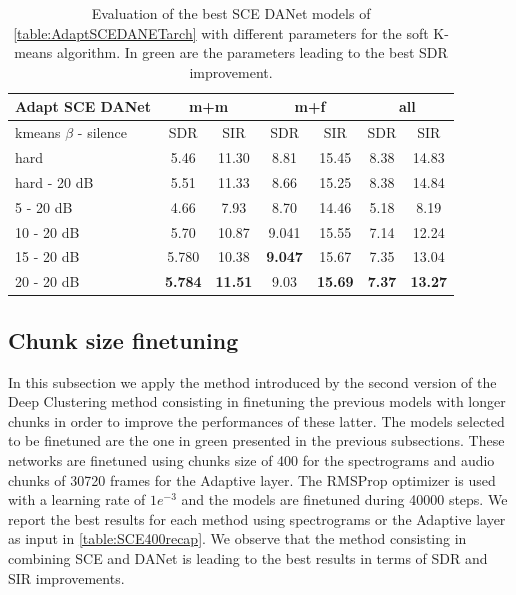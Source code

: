 \documentclass[master, tikz, final,11pt, dvipdfmx]{iscs-thesis}
\begin{document}
\begin{table}[h!]
\centering
\begin{tabular}{l|c|c|c|c|c|c}
Adapt SCE DANet & \multicolumn{2}{c|}{m+m} & \multicolumn{2}{c|}{m+f} & \multicolumn{2}{c}{all} \\ 
\hline 
kmeans $\beta$ - silence & SDR & SIR & SDR & SIR & SDR & SIR \\ 
\hline
hard  & 5.46 & 11.30 & 8.81 & 15.45 & 8.38 & 14.83 \\ 
hard - 20 dB  & 5.51 & 11.33 & 8.66 & 15.25 & 8.38 & 14.84 \\
\hline
\hline
5 - 20 dB  & 4.66 & 7.93 & 8.70 & 14.46 & 5.18 & 8.19 \\ 
10 - 20 dB  & 5.70 & 10.87 & 9.041 & 15.55 & 7.14 & 12.24 \\ 
15 - 20 dB & 5.780 & 10.38 & \cellcolor{green}\textbf{9.047} & \cellcolor{green}15.67 & 7.35 & 13.04 \\ 
20 - 20 dB & \cellcolor{green}\textbf{5.784} & \cellcolor{green}\textbf{11.51} & 9.03 & \textbf{15.69} & \cellcolor{green}\textbf{7.37} & \cellcolor{green}\textbf{13.27} \\ 
\end{tabular}
\caption[Evaluation of the best SCE DANet models using the Adaptive layer for different parameters for the soft K-means algorithm]{Evaluation of the best SCE DANet models of \autoref{table:AdaptSCEDANETarch} with different parameters for the soft K-means algorithm. In green are the parameters leading to the best SDR improvement.}
\label{table:AdaptSCEDANET}
\end{table}

\Needspace{}

\subsection{Chunk size finetuning}
\label{ext}

In this subsection we apply the method introduced by the second version of the Deep Clustering method consisting in finetuning the previous models with longer chunks in order to improve the performances of these latter. The models selected to be finetuned are the one in green presented in the previous subsections. These networks are finetuned using chunks size of 400 for the spectrograms and audio chunks of 30720 frames for the Adaptive layer. The RMSProp optimizer is used with a learning rate of $1e^{-3}$ and the models are finetuned during 40000 steps. We report the best results for each method using spectrograms or the Adaptive layer as input in \autoref{table:SCE400recap}. We observe that the method consisting in combining SCE and DANet is leading to the best results in terms of SDR and SIR improvements.
\end{document}
